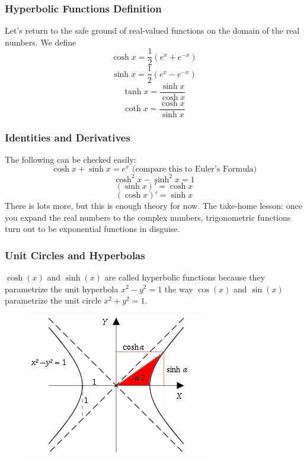 \documentclass[xcolor=dvipsnames]{beamer}
\begin{document}
\begin{frame}
  \frametitle{Hyperbolic Functions Definition}
Let's return to the safe ground of real-valued functions on the
domain of the real numbers. We define
\begin{equation}
  \label{eq:gomedaek}
  \cosh{}x=\frac{1}{2}\left(e^{x}+e^{-x}\right)
\end{equation}
\begin{equation}
  \label{eq:teeyavah}
  \sinh{}x=\frac{1}{2}\left(e^{x}-e^{-x}\right)
\end{equation}
\begin{equation}
  \label{eq:oeyuzahc}
  \tanh{}x=\frac{\sinh{}x}{\cosh{}x}
\end{equation}
\begin{equation}
  \label{eq:ainguchu}
  \coth{}x=\frac{\cosh{}x}{\sinh{}x}
\end{equation}
\end{frame}

\begin{frame}
  \frametitle{Identities and Derivatives}
The following can be checked easily:
\begin{equation}
  \label{eq:wahquain}
  \cosh{}x+\sinh{}x=e^{x}\mbox{ (compare this to Euler's Formula)}
\end{equation}
\begin{equation}
  \label{eq:thaevuan}
  \cosh^{2}x-\sinh^{2}x=1
\end{equation}
\begin{equation}
  \label{eq:gahngoip}
  (\sinh{}x)'=\cosh{}x
\end{equation}
\begin{equation}
  \label{eq:shahsuuw}
  (\cosh{}x)'=\sinh{}x
\end{equation}
There is lots more, but this is enough theory for now. The take-home
lesson: once you expand the real numbers to the complex numbers,
trigonometric functions turn out to be exponential functions in disguise.
\end{frame}

\begin{frame}
  \frametitle{Unit Circles and Hyperbolas}
$\cosh(x)$ and $\sinh(x)$ are called \alert{hyperbolic} functions
because they parametrize the unit hyperbola $x^{2}-y^{2}=1 $ the way
$\cos(x)$ and $\sin(x)$ parametrize the unit circle $x^{2}+y^{2}=1$.
\begin{figure}[h]
\includegraphics[scale=.5]{./diagrams/hyper.png}
\end{figure}
\end{frame}
\end{document}
